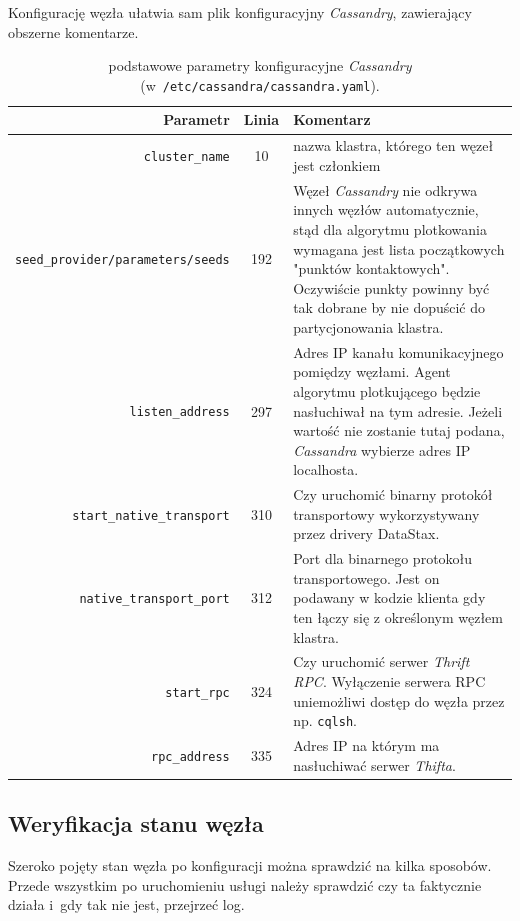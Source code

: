 \documentclass{article} %
\begin{document}
Konfigurację węzła ułatwia sam plik konfiguracyjny \emph{Cassandry}, zawierający obszerne komentarze.

\begin{table}[hhh]
\caption{podstawowe parametry konfiguracyjne \emph{Cassandry} (w~\texttt{/etc/cassandra/cassandra.yaml}).}
\begin{tabular}{|r|c|p{7.5cm}|}
\hline 
\textbf{Parametr} & \textbf{Linia} & \textbf{Komentarz}\\
\hline
\hline
\texttt{cluster\_name} & 10 & nazwa klastra, którego ten węzeł jest członkiem\\
\hline
\texttt{seed\_provider/parameters/seeds} & 192 & Węzeł \emph{Cassandry} nie odkrywa innych węzłów automatycznie, stąd dla algorytmu plotkowania wymagana jest lista początkowych "punktów kontaktowych". Oczywiście punkty powinny być tak dobrane by nie dopuścić do partycjonowania klastra.\\
\hline
\texttt{listen\_address} & 297 & Adres IP kanału komunikacyjnego pomiędzy węzłami. Agent algorytmu plotkującego będzie nasłuchiwał na tym adresie. Jeżeli wartość nie zostanie tutaj podana, \emph{Cassandra} wybierze adres IP localhosta.\\
\hline
\texttt{start\_native\_transport} & 310 & Czy uruchomić binarny protokół transportowy wykorzystywany przez drivery DataStax.\\
\hline
\texttt{native\_transport\_port} & 312 & Port dla binarnego protokołu transportowego. Jest on podawany w kodzie klienta gdy ten łączy się z określonym węzłem klastra.\\
\hline
\texttt{start\_rpc} & 324 & Czy uruchomić serwer \emph{Thrift RPC}. Wyłączenie serwera RPC uniemożliwi dostęp do węzła przez np. \texttt{cqlsh}.\\
\hline
\texttt{rpc\_address} & 335 & Adres IP na którym ma nasłuchiwać serwer \emph{Thifta}.\\
\hline
\end{tabular} 
\label{tab:config_options}
\end{table}

\subsection{Weryfikacja stanu węzła}\label{subsec:config_check}

Szeroko pojęty stan węzła po konfiguracji można sprawdzić na kilka sposobów.
Przede wszystkim po uruchomieniu usługi należy sprawdzić czy ta faktycznie działa i~gdy tak nie jest, przejrzeć log.
\end{document}
